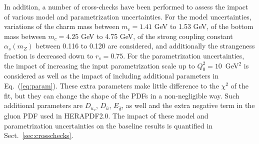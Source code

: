 In addition, a number of cross-checks have been performed to assess the
impact of various model and parametrization uncertainties.
%
For the model uncertainties, variations of the charm mass
between $m_c=1.41$ GeV to 1.53 GeV, of the bottom mass between
$m_c=4.25$ GeV to 4.75 GeV, of the strong coupling constant
$\alpha_s(m_Z)$ between 0.116 to 0.120 are considered, and additionally the
strangeness fraction is decreased down to $r_s=0.75$.
%
For the parametrization uncertainties, the impact
of increasing the input parametrization scale up to $Q_0^2=10$~GeV$^2$ is considered as well as the impact of including additional parameters in Eq.~(\ref{eq:param}).
%
These extra parameters
make little difference to the $\chi^2$ of the fit, but they can
change the shape of the PDFs in a non-negligible way.
%
Such additional parameters are  $D_{u_v}$, $D_{\bar{u}}$, $E_{\bar{d}}$, as well
and the extra negative term  in the gluon PDF used in HERAPDF2.0.
%
The impact of these model and parametrization uncertainties on the baseline results
is quantified in Sect.~\ref{sec:crosschecks}.
